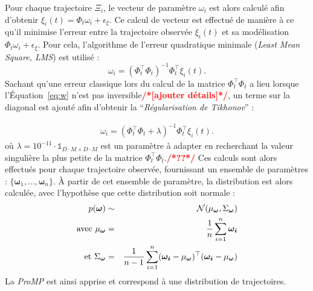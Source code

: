 \documentclass[utf8]{frontiersSCNS} %
\newcommand{\todo}[1]{\textcolor{red}{\textbf{/*#1*/}}}
\begin{document}
Pour chaque trajectoire $\Xi_i$, le vecteur de paramètre $\omega_i$ est alors calculé afin d'obtenir $\xi_i(t) = \Phi_t \omega_i + \epsilon_\xi$. Ce calcul de vecteur est effectué de manière à ce qu'il minimise l'erreur entre la trajectoire observée $\xi_i(t)$ et sa modélisation $\Phi_t \omega_i + \epsilon_\xi$. Pour cela, l'algorithme de l'erreur quadratique minimale (\textit{Least Mean Square, LMS}) est utilisé :
\begin{equation} \label{eq:w}
\omega_i = (\Phi_t^\top\Phi_t)^{-1}\Phi_t^\top \xi_i(t).
\end{equation} 
Sachant qu'une erreur classique lors du calcul de la matrice $\Phi_t^\top\Phi_t$ a lieu lorsque l'Équation~\ref{eq:w} n'est pas inversible\todo{[ajouter détails]}, un terme sur la diagonal est ajouté afin d'obtenir la ``\textit{Régularisation de Tikhonov}'' :

\begin{eqnarray} \label{eq:wInvertible}
\omega_i = (\Phi_t^\top\Phi_t + \lambda)^{-1}\Phi_t^\top \xi_i(t).
\end{eqnarray} 
où $\lambda=10^{-11} \cdot \mathds{1}_{ D\cdot M \times D\cdot M} $ est un paramètre à adapter en recherchant la valeur singulière la plus petite de la matrice $\Phi_t^\top\Phi_t$.\todo{??}
Ces calculs sont alors effectués pour chaque trajectoire observée, fournissant un ensemble de paramètres : $\{\boldsymbol{\omega}_1,\ldots, \boldsymbol{\omega}_n\}$. À partir de cet ensemble de paramètre, la distribution est alors calculée, avec l'hypothèse que cette distribution soit normale :
\begin{eqnarray}
p(\boldsymbol{\omega}) & \sim & \mathcal{N}(\mu_{\boldsymbol{\omega}}, \Sigma_{\boldsymbol{\omega}})\\
\mathrm{avec }~\mu_{\boldsymbol{\omega}} & = & {1 \over n} \sum_{i=1}^n \boldsymbol{\omega_i} \\
\mathrm{et }~\Sigma_{\boldsymbol{\omega}} & = & {1 \over n-1} \sum_{i=1}^n (\boldsymbol{\omega_i} - \mu_{\boldsymbol{\omega}})^\top (\boldsymbol{\omega_i} - \mu_{\boldsymbol{\omega}})
\end{eqnarray}
La \textit{ProMP} est ainsi apprise et correspond à une distribution de trajectoires. 
\end{document}
